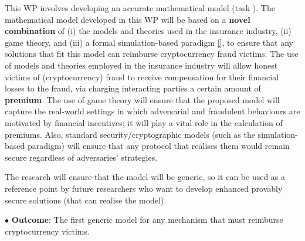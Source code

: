  
 
\vs
\noindent{}
%


\vs
 
This WP involves developing an accurate mathematical model (task \1). The mathematical model developed in this WP will be based on a \textbf{novel combination} of (i) the models and theories used in the insurance industry, (ii) game theory, and (iii) a formal simulation-based paradigm \href{https://link.springer.com/chapter/10.1007/978-3-319-57048-8_6}{[\printcntr]}, to ensure that any solutions that fit this model can reimburse cryptocurrency fraud victims. The use of models and theories employed in the insurance industry will allow honest victims of (cryptocurrency) fraud to receive compensation for their financial losses to the fraud, via charging interacting parties a certain amount of \textbf{premium}. The use of game theory will ensure that the proposed model will capture the real-world settings in which adversarial and fraudulent behaviours are motivated by financial incentives; it will play a vital role in the calculation of premiums. Also, standard security/cryptographic models (such as the simulation-based paradigm) will ensure that any protocol that realises them would remain secure regardless of adversaries’ strategies. 

The research will ensure that the model will be generic, so it can be used as a reference point by future researchers who want to develop enhanced provably secure solutions (that can realise the model).  

 \noindent$\bullet$\textbf{ Outcome}: The first generic model for any mechanism that must reimburse cryptocurrency victims. 
 
 
 
 
 



\vs

